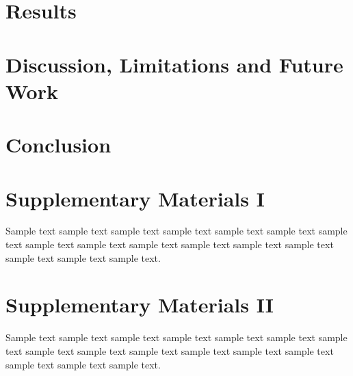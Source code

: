 \documentclass[11pt]{uonthesis}
\begin{document}
\chapter{Results}

\chapter{Discussion, Limitations and Future Work}
\chapter{Conclusion}



\begin{appendices}

\chapter{Supplementary Materials I}

Sample text sample text sample text sample text sample text sample
text sample text sample text sample text sample text sample text
sample text sample text sample text sample text sample text.

\chapter{Supplementary Materials II}

Sample text sample text sample text sample text sample text sample
text sample text sample text sample text sample text sample text
sample text sample text sample text sample text sample text.

\end{appendices}
\end{document}

